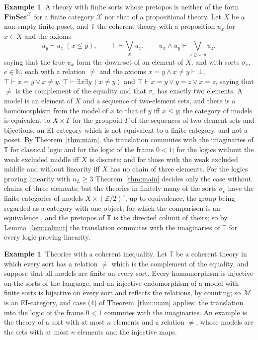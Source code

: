 \documentclass[11pt]{amsart}
\theoremstyle{definition}
\newtheorem{ex}[thm]{Example}
\newcommand{\Fin}{\mathbf{FinSet}}
\newcommand{\cX}{\mathcal X}
\newcommand{\cM}{\mathcal M}
\newcommand{\bT}{\mathbb T}
\begin{document}
\begin{ex}\label{ex:new}
A theory with finite sorts whose pretopos is neither of the form
$\Fin^{\cX}$ for a finite category $\cX$ nor that of a propositional
theory. Let $X$ be a non-empty finite poset, and $\bT$ the
coherent theory with a proposition $u_x$ for $x\in X$ and the axioms
\[
u_y\vdash u_x\ (x\le y),\qquad\top\vdash\bigvee_xu_x,\qquad u_x\wedge
u_y\vdash\bigvee_{z\ge x,y}u_z,
\]
saying that the true $u_x$ form the down-set of an element of $X$,
and with sorts $\sigma_e$, $e\in\mathbb N$, each with a relation $\ne$
and the axioms $x=y\wedge x\ne y\vdash\bot$, $\top\vdash x=y\vee x\ne
y$, $\top\vdash\exists x\exists y\,(x\ne y)$ and $\top\vdash x=y\vee
y=z\vee x=z$, saying that $\ne$ is the complement of the equality and
that $\sigma_e$ has exactly two elements. A model is an element of $X$
and a sequence of two-element sets, and there is a homomorphism from
the model of $x$ to that of $y$ iff $x\le y$; the category of models
is equivalent to $X\times\Gamma$ for the groupoid $\Gamma$ of the sequences of two-element sets
and bijections, an EI-category which is not equivalent to a finite
category, and not a poset. By Theorem~\ref{thm:main}, the translation
commutes with the imaginaries of $\bT$ for classical logic and for
the logic of the frame $0<1$; for the logics without the weak
excluded middle iff $X$ is discrete; and for those with the weak
excluded middle and without linearity iff $X$ has no chain of three
elements. For the logics proving linearity with $n_L\ge3$
Theorem~\ref{thm:main} decides only the case without chains of three
elements; but the theories in finitely many of the sorts $\sigma_e$
have the finite categories of models $X\times(\mathbb Z/2)^e$, up to
equivalence, the group being regarded as a category with one object, for which the comparison is an equivalence
\cite[Cor.~6.2]{Strings}, and the pretopos of $\bT$ is the directed
colimit of theirs; so by Lemma~\ref{lem:colimit} the translation
commutes with the imaginaries of $\bT$ for every logic proving
linearity.
\end{ex}

\begin{ex}
Theories with a coherent inequality. Let $\bT$ be a coherent theory in
which every sort has a relation $\ne$ which is the complement of the
equality, and suppose that all models are finite on every sort. Every
homomorphism is injective on the sorts of the language, and an injective endomorphism of a model
with finite sorts is bijective on every sort and reflects the
relations, by counting; so $\cM$ is an EI-category, and case (4) of
Theorem~\ref{thm:main} applies: the translation into the logic of the
frame $0<1$ commutes with the imaginaries. An example is the theory of
a sort with at most $n$ elements and a relation $\ne$, whose models
are the sets with at most $n$ elements and the injective maps.
\end{ex}
\end{document}
